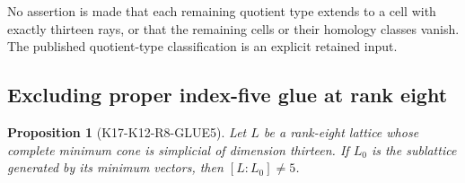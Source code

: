 \documentclass[11pt,a4paper]{article}
\newtheorem{proposition}[theorem]{Proposition}
\theoremstyle{definition}
\begin{document}
No assertion is made that each remaining quotient type extends to
a cell with exactly thirteen rays, or that the remaining cells or
their homology classes vanish. The published quotient-type
classification is an explicit retained input.

\subsection{Excluding proper index-five glue at rank eight}
\label{subsec:k12-r8-glue-five}

\begin{proposition}[K17-K12-R8-GLUE5]\label{prop:k12-r8-glue-five}
Let \(L\) be a rank-eight lattice whose complete minimum cone is
simplicial of dimension thirteen.  If \(L_0\) is the sublattice
generated by its minimum vectors, then \([L:L_0]\ne5\).
\end{proposition}
\end{document}
